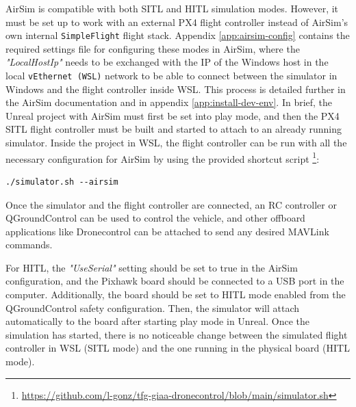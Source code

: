 AirSim is compatible with both SITL and HITL simulation modes.
However, it must be set up to work with an external PX4 flight controller instead of AirSim's own internal \texttt{SimpleFlight} flight stack.
Appendix \ref{app:airsim-config} contains the required settings file for configuring these modes in AirSim,
where the \emph{"LocalHostIp"} needs to be exchanged with the IP of the Windows host in the local \texttt{vEthernet (WSL)} network to be able to connect between the simulator in Windows and the flight controller inside WSL.
This process is detailed further in the AirSim documentation \cite{airsim-px4-wsl} and in appendix \ref{app:install-dev-env}.
In brief, the Unreal project with AirSim must first be set into play mode, and then the PX4 SITL flight controller must be built and started to attach to an already running simulator.
Inside the project in WSL, the flight controller can be run with all the necessary configuration for AirSim by using the provided shortcut script \footnote{\url{https://github.com/l-gonz/tfg-giaa-dronecontrol/blob/main/simulator.sh}}:
\begin{verbatim}
./simulator.sh --airsim
\end{verbatim}
Once the simulator and the flight controller are connected, an RC controller or QGroundControl can be used to control the vehicle, and other offboard applications like Dronecontrol can be attached to send any desired MAVLink commands.

For HITL, the \emph{"UseSerial"} setting should be set to true in the AirSim configuration, and the Pixhawk board should be connected to a USB port in the computer.
Additionally, the board should be set to HITL mode enabled from the QGroundControl safety configuration.
Then, the simulator will attach automatically to the board after starting play mode in Unreal.
Once the simulation has started, there is no noticeable change between the simulated flight controller in WSL (SITL mode) and the one running in the physical board (HITL mode).
